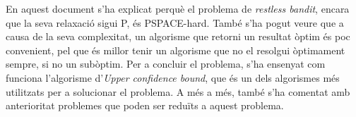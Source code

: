 
	En aquest document s'ha explicat perquè el problema de \textit{restless bandit}, encara que la seva relaxació sigui
	P, és PSPACE-hard. També s'ha pogut veure que a causa de la seva complexitat, un algorisme que retorni un
	resultat òptim és poc convenient, pel que és millor tenir un algorisme que no el resolgui òptimament sempre, si no un
	subòptim. Per a concluir el problema, s'ha ensenyat com funciona l'algorisme d'\textit{Upper confidence bound},
	que és un dels algorismes més utilitzats per a solucionar el problema. A més a més, també s'ha comentat amb anterioritat
	problemes que poden ser reduïts a aquest problema. 
